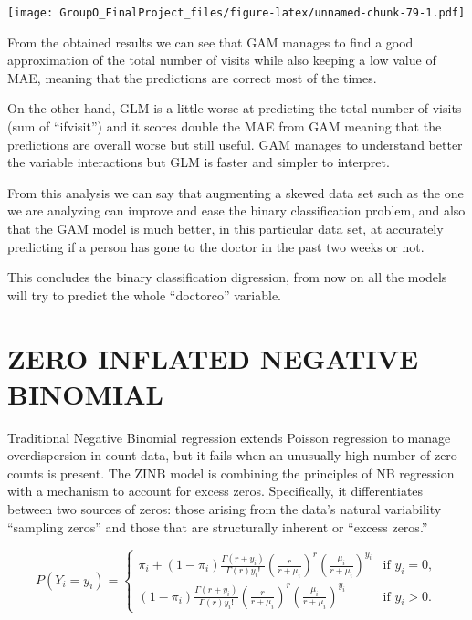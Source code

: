 \documentclass[
]{article}
\begin{document}
\texttt{[image: GroupO\_FinalProject\_files/figure-latex/unnamed-chunk-79-1.pdf]}

From the obtained results we can see that GAM manages to find a good
approximation of the total number of visits while also keeping a low
value of MAE, meaning that the predictions are correct most of the
times.

On the other hand, GLM is a little worse at predicting the total number
of visits (sum of ``ifvisit'') and it scores double the MAE from GAM
meaning that the predictions are overall worse but still useful. GAM
manages to understand better the variable interactions but GLM is faster
and simpler to interpret.

From this analysis we can say that augmenting a skewed data set such as
the one we are analyzing can improve and ease the binary classification
problem, and also that the GAM model is much better, in this particular
data set, at accurately predicting if a person has gone to the doctor in
the past two weeks or not.

This concludes the binary classification digression, from now on all the
models will try to predict the whole ``doctorco'' variable.

\section{ZERO INFLATED NEGATIVE
BINOMIAL}\label{zero-inflated-negative-binomial}

Traditional Negative Binomial regression extends Poisson regression to
manage overdispersion in count data, but it fails when an unusually high
number of zero counts is present. The ZINB model is combining the
principles of NB regression with a mechanism to account for excess
zeros. Specifically, it differentiates between two sources of zeros:
those arising from the data's natural variability ``sampling zeros'' and
those that are structurally inherent or ``excess zeros.''

\[
P(Y_i = y_i) = \left\{
    \begin{array}{ll}
        \pi_i + (1 - \pi_i) \frac{\Gamma(r + y_i)}{\Gamma(r) y_i!} \left(\frac{r}{r + \mu_i}\right)^r \left(\frac{\mu_i}{r + \mu_i}\right)^{y_i} & \mbox{if } y_i = 0, \\
        (1 - \pi_i) \frac{\Gamma(r + y_i)}{\Gamma(r) y_i!} \left(\frac{r}{r + \mu_i}\right)^r \left(\frac{\mu_i}{r + \mu_i}\right)^{y_i} & \mbox{if } y_i > 0.
    \end{array}
\right.
\]
\end{document}
